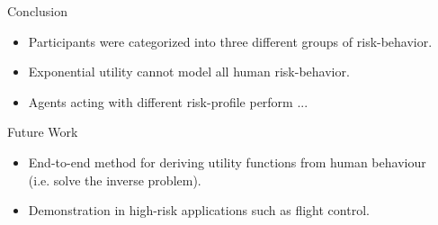 \documentclass[final]{beamer}
\newlength{\sepwid}
\newlength{\onecolwid}
\begin{document}
\begin{frame}
\begin{columns}[t]
\begin{column}{\onecolwid}




\begin{exampleblock}{Conclusion}

\begin{itemize}
    \item Participants were categorized into three different groups of risk-behavior.
    \item Exponential utility cannot model all human risk-behavior.
    \item Agents acting with different risk-profile perform ... 
\end{itemize}

\end{exampleblock}

\begin{exampleblock}{Future Work}

\begin{itemize}
    \item End-to-end method for deriving utility functions from human behaviour (i.e. solve the inverse problem).
    \item Demonstration in high-risk applications such as flight control.
\end{itemize}

\end{exampleblock}

\end{column} %

\begin{column}{\sepwid}\end{column} %

\end{columns} %

\end{frame} %
\end{document}
